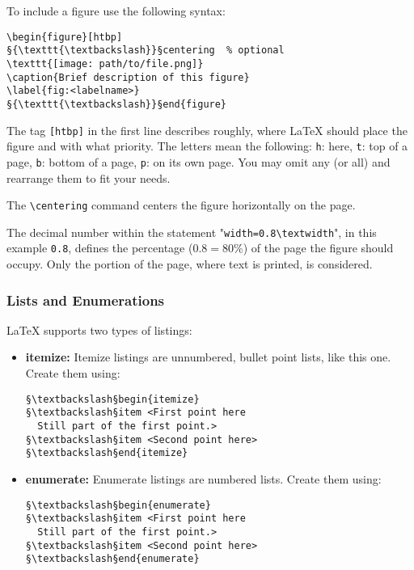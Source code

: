 To include a figure use the following syntax:
\begin{lstlisting}[style=LaTeXStyle]
\begin{figure}[htbp]
§{\texttt{\textbackslash}}§centering  % optional
\texttt{[image: path/to/file.png]}
\caption{Brief description of this figure}
\label{fig:<labelname>}
§{\texttt{\textbackslash}}§end{figure}
\end{lstlisting}

The tag \texttt{[htbp]} in the first line describes roughly, where \LaTeX{} should place the figure and with what priority.
The letters mean the following: \texttt{h}: here, \texttt{t}: top of a page, \texttt{b}: bottom of a page, \texttt{p}: on its own page.
You may omit any (or all) and rearrange them to fit your needs.

The \texttt{{\textbackslash}centering} command centers the figure horizontally on the page.

The decimal number within the statement "\texttt{width=0.8{\textbackslash}textwidth}", in this example \texttt{0.8}, defines the percentage ($0.8 = 80\%$) of the page the figure should occupy.
Only the portion of the page, where text is printed, is considered.

\subsubsection{Lists and Enumerations}

\LaTeX{} supports two types of listings:

\begin{itemize}
\item \textbf{itemize:} Itemize listings are unnumbered, bullet point lists, like this one. Create them using:
\begin{lstlisting}[style=LaTeXStyle]
§\textbackslash§begin{itemize}
§\textbackslash§item <First point here
  Still part of the first point.>
§\textbackslash§item <Second point here>
§\textbackslash§end{itemize}
\end{lstlisting}

\item \textbf{enumerate:} Enumerate listings are numbered lists. Create them using:
\begin{lstlisting}[style=LaTeXStyle]
§\textbackslash§begin{enumerate}
§\textbackslash§item <First point here
  Still part of the first point.>
§\textbackslash§item <Second point here>
§\textbackslash§end{enumerate}
\end{lstlisting}

\end{itemize}

